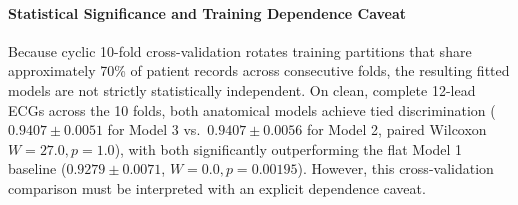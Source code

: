 \documentclass[5p,twocolumn,10pt]{elsarticle}
\begin{document}
\begin{table}[t]
\caption{Cyclic 10-Fold Stratified Cross-Validation Benchmark Results on PTB-XL ($N = 21,799$ Records). Values report Mean $\pm$ Std [95\% CI] across the 10 rotated test folds.}
\label{tab:10fold_results}
\centering
\small
\setlength{\tabcolsep}{4.5pt}
\end{table}

\paragraph{Statistical Significance and Training Dependence Caveat}
Because cyclic 10-fold cross-validation rotates training partitions that share approximately 70\% of patient records across consecutive folds, the resulting fitted models are not strictly statistically independent. On clean, complete 12-lead ECGs across the 10 folds, both anatomical models achieve tied discrimination ($0.9407 \pm 0.0051$ for Model 3 vs.\ $0.9407 \pm 0.0056$ for Model 2, paired Wilcoxon $W = 27.0, p = 1.0$), with both significantly outperforming the flat Model 1 baseline ($0.9279 \pm 0.0071$, $W = 0.0, p = 0.00195$). However, this cross-validation comparison must be interpreted with an explicit dependence caveat. 
\end{document}
